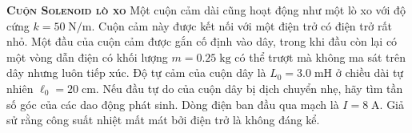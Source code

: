 
\begin{problem}{\textbf{\textsc{Cuộn Solenoid lò xo}}\hspace{1mm}}
	Một cuộn cảm dài cũng hoạt động như một lò xo với độ cứng $k=50\;\mathrm{N/m}$. Cuộn cảm này được kết nối với một điện trở có điện trở rất nhỏ. Một đầu của cuộn cảm được gắn cố định vào dây, trong khi đầu còn lại có một vòng dẫn điện có khối lượng $m=0.25\;\mathrm{kg}$ có thể trượt mà không ma sát trên dây nhưng luôn tiếp xúc. Độ tự cảm của cuộn dây là $L_0=3.0\;\mathrm{mH}$ ở chiều dài tự nhiên $\ell_0=20\;\mathrm{cm}$. Nếu đầu tự do của cuộn dây bị dịch chuyển nhẹ, hãy tìm tần số góc của các dao động phát sinh. Dòng điện ban đầu qua mạch là $I=8\;\mathrm{A}$. Giả sử rằng công suất nhiệt mất mát bởi điện trở là không đáng kể.    
\end{problem}
